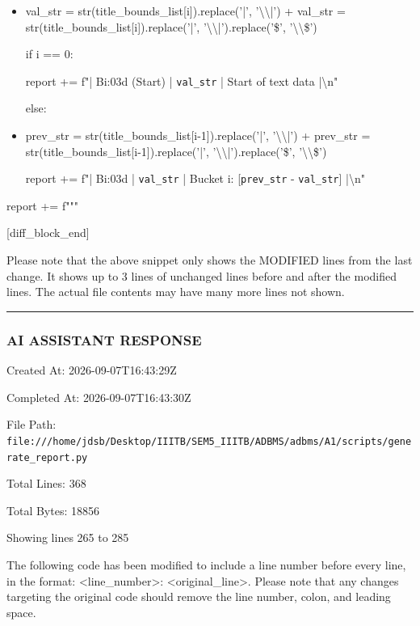 \documentclass[11pt,a4paper]{article}
\begin{document}
\begin{itemize}
\item        val\_str = str(title\_bounds\_list[i]).replace('|', '\textbackslash{}\textbackslash{}|')
+        val\_str = str(title\_bounds\_list[i]).replace('|', '\textbackslash{}\textbackslash{}|').replace('\$', '\textbackslash{}\textbackslash{}\$')

if i == 0:

report += f"| B{i:03d} (Start) | \texttt{{val\_str}} | Start of text data |\textbackslash{}n"

else:

\item            prev\_str = str(title\_bounds\_list[i-1]).replace('|', '\textbackslash{}\textbackslash{}|')
+            prev\_str = str(title\_bounds\_list[i-1]).replace('|', '\textbackslash{}\textbackslash{}|').replace('\$', '\textbackslash{}\textbackslash{}\$')

report += f"| B{i:03d} | \texttt{{val\_str}} | Bucket {i}: [\texttt{{prev\_str}} - \texttt{{val\_str}}] |\textbackslash{}n"

\end{itemize}

report += f"""

[diff\_block\_end]


Please note that the above snippet only shows the MODIFIED lines from the last change. It shows up to 3 lines of unchanged lines before and after the modified lines. The actual file contents may have many more lines not shown.


\hrule

\subsubsection{AI ASSISTANT RESPONSE}

Created At: 2026-09-07T16:43:29Z

Completed At: 2026-09-07T16:43:30Z

File Path: \texttt{file:///home/jdsb/Desktop/IIITB/SEM5\_IIITB/ADBMS/adbms/A1/scripts/generate\_report.py}

Total Lines: 368

Total Bytes: 18856

Showing lines 265 to 285

The following code has been modified to include a line number before every line, in the format: <line\_number>: <original\_line>. Please note that any changes targeting the original code should remove the line number, colon, and leading space.
\end{document}
